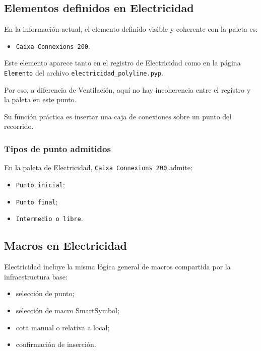 \subsection{Elementos definidos en Electricidad}

En la información actual, el elemento definido visible y coherente con la paleta es:

\begin{itemize}
\item \texttt{Caixa Connexions 200}.
\end{itemize}

Este elemento aparece tanto en el registro de Electricidad como en la página \texttt{Elemento} del archivo \texttt{electricidad\_polyline.pyp}.

Por eso, a diferencia de Ventilación, aquí no hay incoherencia entre el registro y la paleta en este punto.

Su función práctica es insertar una caja de conexiones sobre un punto del recorrido.


\subsubsection{Tipos de punto admitidos}

En la paleta de Electricidad, \texttt{Caixa Connexions 200} admite:

\begin{itemize}
\item \texttt{Punto inicial};
\item \texttt{Punto final};
\item \texttt{Intermedio o libre}.
\end{itemize}

\subsection{Macros en Electricidad}

Electricidad incluye la misma lógica general de macros compartida por la infraestructura base:

\begin{itemize}
\item selección de punto;
\item selección de macro SmartSymbol;
\item cota manual o relativa a local;
\item confirmación de inserción.
\end{itemize}

